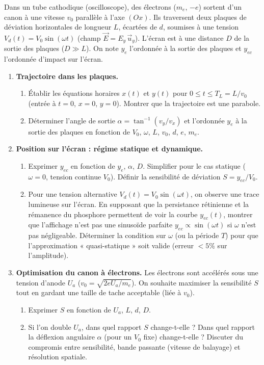 \documentclass[11pt]{article}
\begin{document}
\begin{exercice}
Dans un tube cathodique (oscilloscope), des électrons ($m_e$, $-e$) sortent d'un canon à une vitesse $v_0$ parallèle à l'axe $(Ox)$. Ils traversent deux plaques de déviation horizontales de longueur $L$, écartées de $d$, soumises à une tension $V_d(t) = V_0 \sin(\omega t)$ (champ $\vec{E} = E_y\,\vec{u}_y$). L'écran est à une distance $D$ de la sortie des plaques ($D \gg L$). On note $y_e$ l'ordonnée à la sortie des plaques et $y_{ec}$ l'ordonnée d'impact sur l'écran.

\begin{enumerate}
    \item \textbf{Trajectoire dans les plaques.} 
    \begin{enumerate}
        \item Établir les équations horaires $x(t)$ et $y(t)$ pour $0 \le t \le T_L = L/v_0$ (entrée à $t=0$, $x=0$, $y=0$). Montrer que la trajectoire est une parabole.
        \item Déterminer l'angle de sortie $\alpha = \tan^{-1}(v_y/v_x)$ et l'ordonnée $y_e$ à la sortie des plaques en fonction de $V_0$, $\omega$, $L$, $v_0$, $d$, $e$, $m_e$.
    \end{enumerate}
    \item \textbf{Position sur l'écran : régime statique et dynamique.} 
    \begin{enumerate}
        \item Exprimer $y_{ec}$ en fonction de $y_e$, $\alpha$, $D$. Simplifier pour le cas statique ($\omega = 0$, tension continue $V_0$). Définir la sensibilité de déviation $S = y_{ec}/V_0$.
        \item Pour une tension alternative $V_d(t) = V_0 \sin(\omega t)$, on observe une trace lumineuse sur l'écran. En supposant que la persistance rétinienne et la rémanence du phosphore permettent de voir la courbe $y_{ec}(t)$, montrer que l'affichage n'est pas une sinusoïde parfaite $y_{ec} \propto \sin(\omega t)$ si $\omega$ n'est pas négligeable. Déterminer la condition sur $\omega$ (ou la période $T$) pour que l'approximation « quasi-statique » soit valide (erreur $< 5\%$ sur l'amplitude).
    \end{enumerate}
    \item \textbf{Optimisation du canon à électrons.} 
    Les électrons sont accélérés sous une tension d'anode $U_a$ ($v_0 = \sqrt{2eU_a/m_e}$). On souhaite maximiser la sensibilité $S$ tout en gardant une taille de tache acceptable (liée à $v_0$). 
    \begin{enumerate}
        \item Exprimer $S$ en fonction de $U_a$, $L$, $d$, $D$. 
        \item Si l'on double $U_a$, dans quel rapport $S$ change-t-elle ? Dans quel rapport la déflexion angulaire $\alpha$ (pour un $V_0$ fixe) change-t-elle ? Discuter du compromis entre sensibilité, bande passante (vitesse de balayage) et résolution spatiale.
    \end{enumerate}
\end{enumerate}
\end{exercice}
\end{document}
